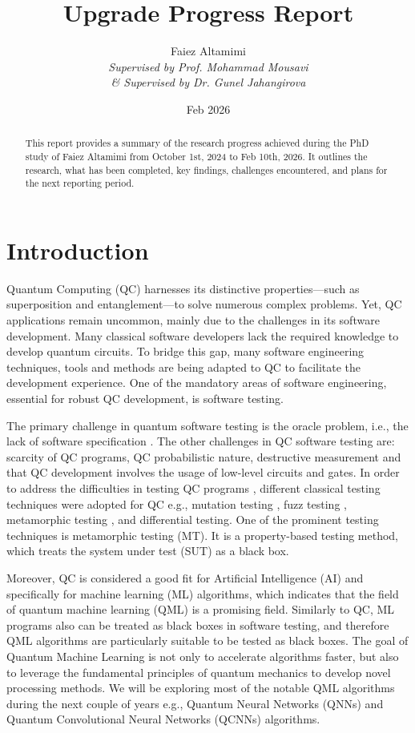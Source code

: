 \documentclass[12pt,a4paper]{article}
\title{Upgrade Progress Report}
\author{Faiez Altamimi
	\\ \textit{Supervised by Prof. Mohammad Mousavi}
	\\ \textit{\& Supervised by Dr. Gunel Jahangirova}
}
\date{Feb 2026}
\begin{document}
	
	\maketitle 
	
	\begin{abstract}
		This report provides a summary of the research progress achieved during the PhD study of Faiez Altamimi from October 1st, 2024 to Feb 10th, 2026. It outlines the research, what has been completed, key findings, challenges encountered, and plans for the next reporting period.
	\end{abstract}
	
	\tableofcontents 
	\newpage 
	
	\section{Introduction}
	\label{sec:introduction}
	
	Quantum Computing (QC) harnesses its distinctive properties—such as superposition and entanglement—to solve numerous complex problems. Yet, QC applications remain uncommon, mainly due to the challenges in its software development. Many classical software developers lack the required knowledge to develop quantum circuits. To bridge this gap, many software engineering techniques, tools and methods are being adapted to QC to facilitate the development experience. One of the mandatory areas of software engineering, essential for robust QC development, is software testing.
	
	The primary challenge in quantum software testing is the oracle problem, i.e., the lack of software specification \cite{9036058}. The other challenges in QC software testing are: scarcity of QC programs, QC probabilistic nature, destructive measurement \cite{wang2023qucatcombinatorialtestingtool} and that QC development involves the usage of low-level circuits and gates. In order to address the difficulties in testing QC programs \cite{garousi2020software}, different classical testing techniques were adopted for QC e.g., mutation testing \cite{9844849}, fuzz testing \cite{wang2018quanfuzzfuzztestingquantum}, metamorphic testing \cite{10.1145/3528230.352918}, and differential testing. One of the prominent testing techniques is metamorphic testing (MT). It is a property-based testing method, which treats the system under test (SUT) as a black box. 
	
	Moreover, QC is considered a good fit for Artificial Intelligence (AI) and specifically for machine learning (ML) algorithms, which indicates that the field of quantum machine learning (QML) is a promising field. Similarly to QC, ML programs also can be treated as black boxes in software testing, and therefore QML algorithms are particularly suitable to be tested as black boxes. The goal of Quantum Machine Learning is not only to accelerate algorithms faster, but also to leverage the fundamental principles of quantum mechanics to develop novel processing methods. We will be exploring most of the notable QML algorithms during the next couple of years e.g., Quantum Neural Networks (QNNs) and Quantum Convolutional Neural Networks (QCNNs) algorithms.
	
\end{document}
